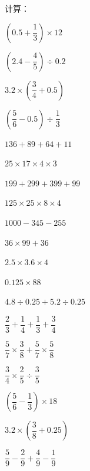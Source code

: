 \documentclass[a4paper,12pt]{ctexart}
\begin{document}
\begin{exercise}
\item 计算：
  \begin{subexercise}
    \item $\left(0.5+\dfrac{1}{3}\right)\times12$
    \item $\left(2.4-\dfrac{4}{5}\right)\div0.2$
    \item $3.2\times\left(\dfrac{3}{4}+0.5\right)$
    \item $\left(\dfrac{5}{6}-0.5\right)\div\dfrac{1}{3}$
  \end{subexercise}
\end{exercise}

\newpage


\begin{exercise}
\item $136+89+64+11$
\item $25\times17\times4\times3$
\item $199+299+399+99$
\item $125\times25\times8\times4$
\item $1000-345-255$
\item $36\times99+36$
\item $2.5\times3.6\times4$
\item $0.125\times88$
\item $4.8\div0.25+5.2\div0.25$
\item $\dfrac{2}{3}+\dfrac{1}{4}+\dfrac{1}{3}+\dfrac{3}{4}$
\item $\dfrac{5}{7}\times\dfrac{3}{8}+\dfrac{5}{7}\times\dfrac{5}{8}$
\item $\dfrac{3}{4}\times\dfrac{2}{5}\div\dfrac{3}{5}$
\item $\left(\dfrac{5}{6}-\dfrac{1}{3}\right)\times18$
\item $3.2\times\left(\dfrac{3}{8}+0.25\right)$
\item $\dfrac{5}{9}-\dfrac{2}{9}+\dfrac{4}{9}-\dfrac{1}{9}$
\end{exercise}

\newpage

\end{document}
